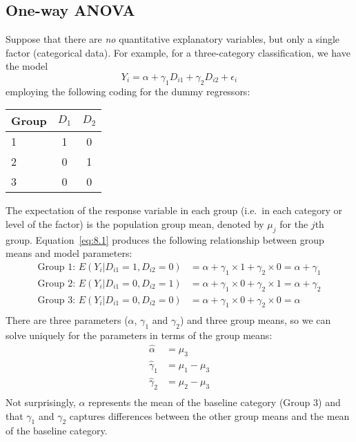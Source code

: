 \subsection*{One-way ANOVA}
Suppose that there are {\it no} quantitative explanatory variables, but only a single factor (categorical data).  For example, for a three-category classification, we have the model
\begin{equation}
Y_i = \alpha + \gamma_1 D_{i1} + \gamma_2 D_{i2} + \epsilon_i
\label{eq:8.1}
\end{equation}
employing the following coding for the dummy regressors:

\begin{table}[H]
	\label{tab:8.1.1}
	\centering
	\begin{tabular}{lcc}
		\toprule
		Group & $D_1$ & $D_2$\\
		\hline
		1 & 1 & 0 \\
		2 & 0 & 1 \\
		3 & 0 & 0 \\
		\bottomrule
	\end{tabular}
\end{table}

The expectation of the response variable in each group (i.e.~in each category or level of the factor) is the population group mean, denoted by $\mu_j$ for the $j$th group.  Equation~\ref{eq:8.1} produces the following relationship between group means and model parameters:
$$
\begin{aligned}
	\mbox{Group 1: } \textit{E}(Y_i | D_{i1} = 1, D_{i2} = 0) &= \alpha + \gamma_1 \times 1 + \gamma_2 \times 0 = \alpha + \gamma_1\\ 
	\mbox{Group 2: } \textit{E}(Y_i | D_{i1} = 0, D_{i2} = 1) &= \alpha + \gamma_1 \times 0 + \gamma_2 \times 1 = \alpha + \gamma_2\\ 
	\mbox{Group 3: } \textit{E}(Y_i | D_{i1} = 0, D_{i2} = 0) &= \alpha + \gamma_1 \times 0 + \gamma_2 \times 0 = \alpha\\ 		
\end{aligned}
$$
There are three parameters ($\alpha$, $\gamma_1$ and $\gamma_2$) and three group means, so we can solve uniquely for the parameters in terms of the group means:
$$
\begin{aligned}
	\hat{\alpha} &= \mu_3\\
	\hat{\gamma}_1 &= \mu_1 - \mu_3\\
	\hat{\gamma}_2 &= \mu_2 - \mu_3\\
\end{aligned}
$$
Not surprisingly, $\alpha$ represents the mean of the baseline category (Group 3) and that $\gamma_1$ and $\gamma_2$ captures differences between the other group means and the mean of the baseline category.

